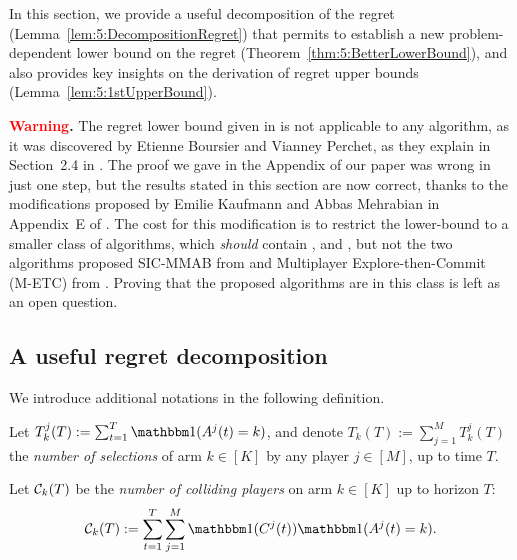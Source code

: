 In this section, we provide a useful decomposition of the regret (Lemma~\ref{lem:5:DecompositionRegret}) that permits to establish a new problem-dependent lower bound on the regret (Theorem~\ref{thm:5:BetterLowerBound}), and also provides key insights on the derivation of regret upper bounds (Lemma~\ref{lem:5:1stUpperBound}).

  \textbf{\textcolor{red}{Warning}.}
  The regret lower bound given in \cite{Besson2018ALT} is not applicable to any algorithm,
  as it was discovered by Etienne Boursier and Vianney Perchet, as they explain in Section~2.4 in \cite{BoursierPerchet18}.
  The proof we gave in the Appendix of our paper \cite{Besson2018ALT} was wrong in just one step,
  but the results stated in this section are now correct,
  thanks to the modifications proposed by Emilie Kaufmann and Abbas Mehrabian in Appendix~E of \cite{KaufmannAbbas19}.
  The cost for this modification is to restrict the lower-bound to a smaller class of algorithms, which \emph{should} contain \RhoRand, \RandTopM{} and \MCTopM, but not the two algorithms proposed SIC-MMAB from \cite{BoursierPerchet18} and Multiplayer Explore-then-Commit (M-ETC) from \cite{KaufmannAbbas19}.
  Proving that the proposed algorithms are in this class is left as an open question.


\subsection{A useful regret decomposition}
\label{sub:5:defregret}

We introduce additional notations in the following definition.

\begin{definition}
  \label{def:5:nbSelections_nbCollisions}
  Let $T^j_k(T) := \sum_{t=1}^T \indic(A^j(t) = k)$,
  and denote $T_k(T) := \sum_{j=1}^M T^j_k(T)$ the \emph{number of selections} of arm $k\in[K]$ by any player $j\in[M]$, up to time $T$.

  Let $\mathcal{C}_k(T)$ be the \emph{number of colliding players} on arm $k\in[K]$ up to horizon $T$:
  \begin{equation}
    \cC_k(T) :=
    \sum_{t=1}^{T} \sum_{j=1}^{M} \indic(C^j(t)) \indic(A^j(t) = k).
  \end{equation}
\end{definition}

